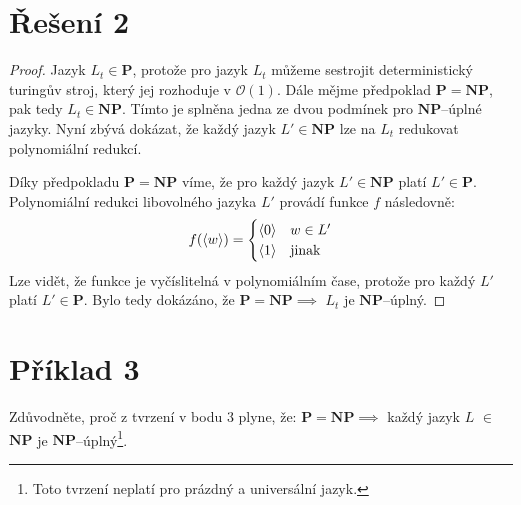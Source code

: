 \documentclass[a4paper, 11pt, fleqn]{scrartcl}
\begin{document}
 \section*{Řešení 2}
  \begin{proof}
    Jazyk $L_t \in \mathbf{P}$, protože pro jazyk $L_t$ můžeme sestrojit deterministický turingův stroj, který jej rozhoduje v $\mathcal{O}(1)$. Dále mějme předpoklad $\mathbf{P} = \mathbf{NP}$, pak tedy $L_t \in \mathbf{NP}$. Tímto je splněna jedna ze dvou podmínek pro $\mathbf{NP}$--úplné jazyky. Nyní zbývá dokázat, že každý jazyk $L' \in \mathbf{NP}$ lze na $L_t$ redukovat polynomiální redukcí.

    Díky předpokladu $\mathbf{P} = \mathbf{NP}$ víme, že pro každý jazyk $L' \in \mathbf{NP}$ platí $L' \in \mathbf{P}$. Polynomiální redukci libovolného jazyka $L'$ provádí funkce $f$ následovně:
    $$ f(\langle w \rangle) = \begin{cases}
                              \langle 0 \rangle & w \in L'\\
                              \langle 1 \rangle & \textnormal{jinak}
                              \end{cases} $$
    Lze vidět, že funkce je vyčíslitelná v polynomiálním čase, protože pro každý $L'$ platí $L' \in \mathbf{P}$. Bylo tedy dokázáno, že $\mathbf{P} = \mathbf{NP} \implies$ $L_t$ je $\mathbf{NP}$--úplný.

  \end{proof}


 \section*{Příklad 3}
  Zdůvodněte, proč z tvrzení v bodu 3 plyne, že: $\mathbf{P} = \mathbf{NP} \implies$ každý jazyk $L$ $\in$ $\mathbf{NP}$ je $\mathbf{NP}$--úplný\footnote{\label{footnote}Toto tvrzení neplatí pro prázdný a universální jazyk.}.
\end{document}
